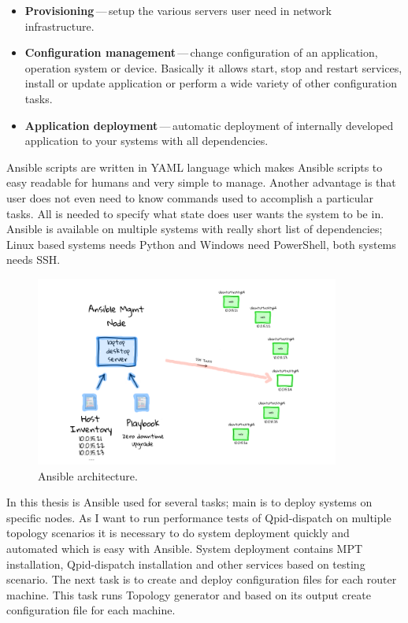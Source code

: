 \begin{itemize}
	\item \textbf{Provisioning}\,---\,setup the various servers user need in network infrastructure.
	\item \textbf{Configuration management}\,---\,change configuration of an application, operation system or device. Basically it allows start, stop and restart services, install or update application or perform a wide variety of other configuration tasks.
	\item \textbf{Application deployment}\,---\,automatic deployment of internally developed application to your systems with all dependencies.
\end{itemize}

Ansible scripts are written in YAML language which makes Ansible scripts to easy readable for humans and very simple to manage. Another advantage is that user does not even need to know commands used to accomplish a particular tasks. All is needed to specify what state does user wants the system to be in. Ansible is available on multiple systems with really short list of dependencies; Linux based systems needs Python and Windows need PowerShell, both systems needs SSH.

\begin{figure}[H]
  \centering
  \includegraphics[width=10cm]{obrazky-figures/ansible.png}
  \caption{Ansible architecture. }
  \label{fig:ansible_architecture}
\end{figure}

In this thesis is Ansible used for several tasks; main is to deploy systems on specific nodes. As I want to run performance tests of Qpid-dispatch on multiple topology scenarios it is necessary to do system deployment quickly and automated which is easy with Ansible. System deployment contains MPT installation, Qpid-dispatch installation and other services based on testing scenario. The next task is to create and deploy configuration files for each router machine. This task runs Topology generator and based on its output create configuration file for each machine.


